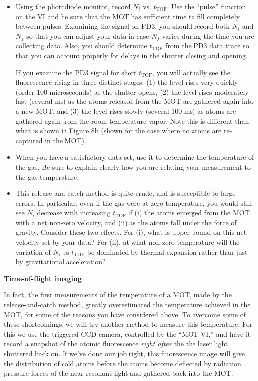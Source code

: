 \documentclass{../lab}
\begin{document}
\begin{itemize}
    \item Using the photodiode monitor, record $N_i$ vs. $t_\text{TOF}$. Use the ``pulse'' function on the VI and be sure that the MOT has sufficient time to fill completely between pulses. Examining the signal on PD3, you should record both $N_i$ and $N_f$ so that you can adjust your data in case $N_f$ varies during the time you are collecting data. Also, you should determine $t_\text{TOF}$ from the PD3 data trace so that you can account properly for delays in the shutter closing and opening.

    If you examine the PD3 signal for short $t_\text{TOF}$, you will actually see the fluorescence rising in three distinct stages: (1) the level rises very quickly (order 100 microseconds) as the shutter opens, (2) the level rises moderately fast (several ms) as the atoms released from the MOT are gathered again into a new MOT, and (3) the level rises slowly (several 100 ms) as atoms are gathered again from the room temperature vapor. Note this is different than what is shown in Figure 8b (shown for the case where no atoms are re-captured in the MOT).

    \item When you have a satisfactory data set, use it to determine the temperature of the gas. Be sure to explain clearly how you are relating your measurement to the gas temperature.

    \item This release-and-catch method is quite crude, and is susceptible to large errors. In particular, even if the gas were at zero temperature, you would still see $N_i$ decrease with increasing $t_\text{TOF}$ if (i) the atoms emerged from the MOT with a net non-zero velocity, and (ii) as the atoms fall under the force of gravity. Consider these two effects. For (i), what is upper bound on this net velocity set by your data? For (ii), at what non-zero temperature will the variation of $N_i$ vs $t_\text{TOF}$ be dominated by thermal expansion rather than just by gravitational acceleration?
\end{itemize}

\textbf{Time-of-flight imaging}

In fact, the first measurements of the temperature of a MOT, made by the release-and-catch method, greatly overestimated the temperature achieved in the MOT, for some of the reasons you have considered above. To overcome some of these shortcomings, we will try another method to measure this temperature. For this we use the triggered CCD camera, controlled by the ``MOT VI,'' and have it record a snapshot of the atomic fluorescence \emph{right after} the the laser light shuttered back on. If we've done our job right, this fluorescence image will give the distribution of cold atoms before the atoms become deflected by radiation pressure forces of the near-resonant light and gathered back into the MOT.
\end{document}
